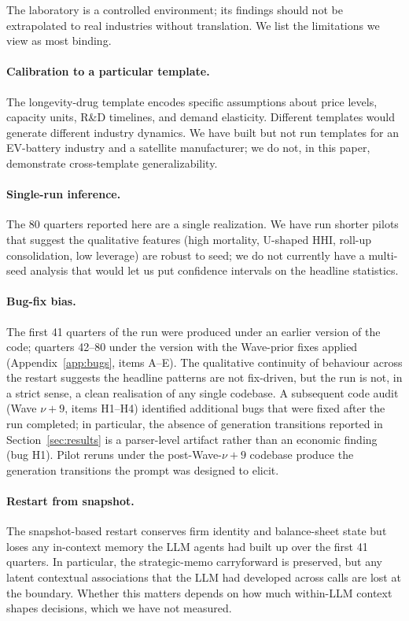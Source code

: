 \documentclass[11pt]{article}
\begin{document}
The laboratory is a controlled environment; its findings should not be
extrapolated to real industries without translation. We list the
limitations we view as most binding.

\paragraph{Calibration to a particular template.} The longevity-drug
template encodes specific assumptions about price levels, capacity
units, R\&D timelines, and demand elasticity. Different templates would
generate different industry dynamics. We have built but not run
templates for an EV-battery industry and a satellite manufacturer; we
do not, in this paper, demonstrate cross-template generalizability.

\paragraph{Single-run inference.} The 80 quarters reported here are a
single realization. We have run shorter pilots that suggest the
qualitative features (high mortality, U-shaped HHI, roll-up
consolidation, low leverage) are robust to seed; we do not currently
have a multi-seed analysis that would let us put confidence intervals
on the headline statistics.

\paragraph{Bug-fix bias.} The first 41 quarters of the run were
produced under an earlier version of the code; quarters 42--80 under
the version with the Wave-prior fixes applied (Appendix~\ref{app:bugs},
items A--E). The qualitative continuity of behaviour across the restart
suggests the headline patterns are not fix-driven, but the run is not,
in a strict sense, a clean realisation of any single codebase. A
subsequent code audit (Wave $\nu+9$, items H1--H4) identified
additional bugs that were fixed after the run completed; in particular,
the absence of generation transitions reported in
Section~\ref{sec:results} is a parser-level artifact rather than an
economic finding (bug H1). Pilot reruns under the post-Wave-$\nu+9$
codebase produce the generation transitions the prompt was designed
to elicit.

\paragraph{Restart from snapshot.} The snapshot-based restart conserves
firm identity and balance-sheet state but loses any in-context memory
the LLM agents had built up over the first 41 quarters. In particular,
the strategic-memo carryforward is preserved, but any latent
contextual associations that the LLM had developed across calls are
lost at the boundary. Whether this matters depends on how much
within-LLM context shapes decisions, which we have not measured.
\end{document}
